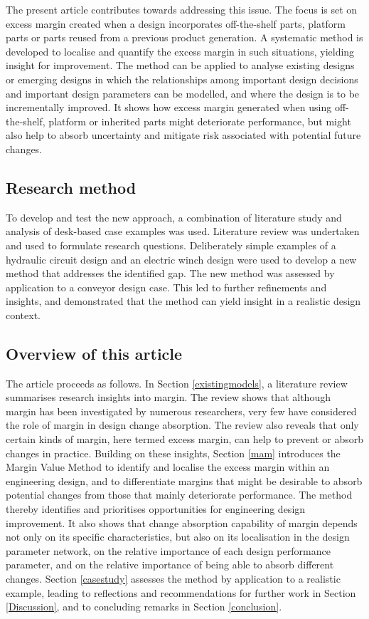 The present article contributes towards addressing this issue. The focus is set on excess margin created when a design incorporates off-the-shelf parts, platform parts or parts reused from a previous product generation. A systematic method is developed to localise and quantify the excess margin in such situations, yielding insight for improvement. The method can be applied to analyse existing designs or emerging designs in which the relationships among important design decisions and important design parameters can be modelled, and where the design is to be incrementally improved. It shows how excess margin generated when using off-the-shelf, platform or inherited parts might deteriorate performance, but might also help to absorb uncertainty and mitigate risk associated with potential future changes.


\subsection{Research method}

To develop and test the new approach, a combination of literature study and analysis of desk-based case examples was used. Literature review was undertaken and used to formulate research questions. Deliberately simple examples of a hydraulic circuit design and an electric winch design were used to develop a new method that addresses the identified gap. The new method was assessed by application to a conveyor design case. This led to further refinements and insights, and demonstrated that the method can yield insight in a realistic design context.

\subsection{Overview of this article}
The article proceeds as follows. In Section \ref{existingmodels}, a literature review summarises research insights into margin. The review shows that although margin has been investigated by numerous researchers, very few have considered the role of margin in design change absorption. The review also reveals that only certain kinds of margin, here termed excess margin, can help to prevent or absorb changes in practice. Building on these insights, Section \ref{mam} introduces the Margin Value Method to identify and localise the excess margin within an engineering design, and to differentiate margins that might be desirable to absorb potential changes from those that mainly deteriorate performance. The method thereby identifies and prioritises opportunities for engineering design improvement. It also shows that change absorption capability of margin depends not only on its specific characteristics, but also on its localisation in the design parameter network, on the relative importance of each design performance parameter, and on the relative importance of being able to absorb different changes. Section \ref{casestudy} assesses the method by application to a realistic example, leading to reflections and recommendations for further work in Section \ref{Discussion}, and to concluding remarks in Section \ref{conclusion}.


